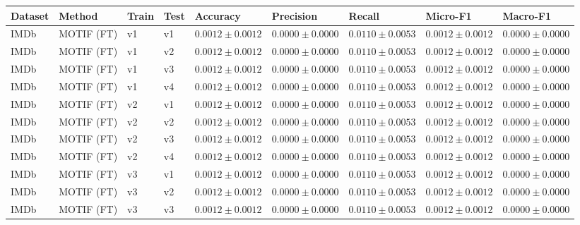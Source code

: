 \begin{table}[htbp]
\centering
\small
\renewcommand{\arraystretch}{1.15}
\setlength{\tabcolsep}{5pt}
\begin{adjustbox}{max width=\linewidth}
\begin{tabular}{|l|l|l|l|l|l|l|l|l|}
\hline
\textbf{Dataset} & \textbf{Method} & \textbf{Train} & \textbf{Test} & \textbf{Accuracy} & \textbf{Precision} & \textbf{Recall} & \textbf{Micro-F1} & \textbf{Macro-F1} \\
\hline
IMDb & MOTIF (FT) & v1 & v1 & $0.0012 \pm 0.0012$ & $0.0000 \pm 0.0000$ & $0.0110 \pm 0.0053$ & $0.0012 \pm 0.0012$ & $0.0000 \pm 0.0000$ \\
\hline
IMDb & MOTIF (FT) & v1 & v2 & $0.0012 \pm 0.0012$ & $0.0000 \pm 0.0000$ & $0.0110 \pm 0.0053$ & $0.0012 \pm 0.0012$ & $0.0000 \pm 0.0000$ \\
\hline
IMDb & MOTIF (FT) & v1 & v3 & $0.0012 \pm 0.0012$ & $0.0000 \pm 0.0000$ & $0.0110 \pm 0.0053$ & $0.0012 \pm 0.0012$ & $0.0000 \pm 0.0000$ \\
\hline
IMDb & MOTIF (FT) & v1 & v4 & $0.0012 \pm 0.0012$ & $0.0000 \pm 0.0000$ & $0.0110 \pm 0.0053$ & $0.0012 \pm 0.0012$ & $0.0000 \pm 0.0000$ \\
\hline
IMDb & MOTIF (FT) & v2 & v1 & $0.0012 \pm 0.0012$ & $0.0000 \pm 0.0000$ & $0.0110 \pm 0.0053$ & $0.0012 \pm 0.0012$ & $0.0000 \pm 0.0000$ \\
\hline
IMDb & MOTIF (FT) & v2 & v2 & $0.0012 \pm 0.0012$ & $0.0000 \pm 0.0000$ & $0.0110 \pm 0.0053$ & $0.0012 \pm 0.0012$ & $0.0000 \pm 0.0000$ \\
\hline
IMDb & MOTIF (FT) & v2 & v3 & $0.0012 \pm 0.0012$ & $0.0000 \pm 0.0000$ & $0.0110 \pm 0.0053$ & $0.0012 \pm 0.0012$ & $0.0000 \pm 0.0000$ \\
\hline
IMDb & MOTIF (FT) & v2 & v4 & $0.0012 \pm 0.0012$ & $0.0000 \pm 0.0000$ & $0.0110 \pm 0.0053$ & $0.0012 \pm 0.0012$ & $0.0000 \pm 0.0000$ \\
\hline
IMDb & MOTIF (FT) & v3 & v1 & $0.0012 \pm 0.0012$ & $0.0000 \pm 0.0000$ & $0.0110 \pm 0.0053$ & $0.0012 \pm 0.0012$ & $0.0000 \pm 0.0000$ \\
\hline
IMDb & MOTIF (FT) & v3 & v2 & $0.0012 \pm 0.0012$ & $0.0000 \pm 0.0000$ & $0.0110 \pm 0.0053$ & $0.0012 \pm 0.0012$ & $0.0000 \pm 0.0000$ \\
\hline
IMDb & MOTIF (FT) & v3 & v3 & $0.0012 \pm 0.0012$ & $0.0000 \pm 0.0000$ & $0.0110 \pm 0.0053$ & $0.0012 \pm 0.0012$ & $0.0000 \pm 0.0000$ \\

\end{tabular}
\end{adjustbox}
\end{table}
